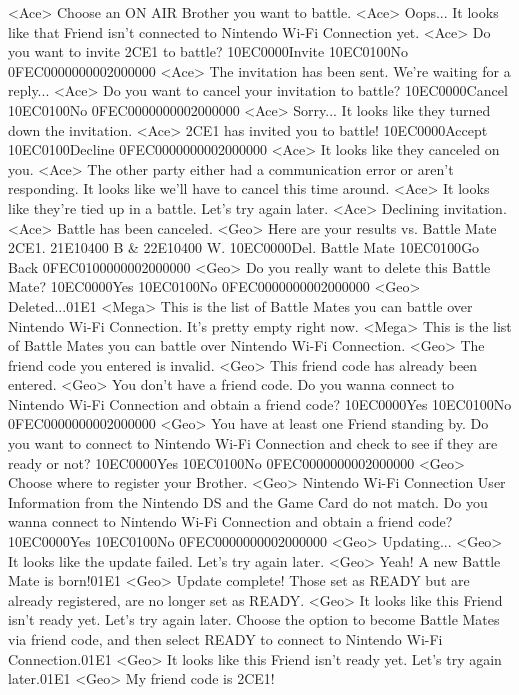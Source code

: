 <Ace> Choose an ON AIR Brother you want to battle. 
<Ace> Oops... It looks like that Friend isn't connected to Nintendo Wi-Fi Connection yet. 
<Ace> Do you want to invite {2C}{E1} to battle? {10}{EC}{00}{00}Invite {10}{EC}{01}{00}No {0F}{EC}{00}{00}{00}{00}{02}{00}{00}{00}
<Ace> The invitation has been sent. We're waiting for a reply...
<Ace> Do you want to cancel your invitation to battle? {10}{EC}{00}{00}Cancel {10}{EC}{01}{00}No {0F}{EC}{00}{00}{00}{00}{02}{00}{00}{00}
<Ace> Sorry... It looks like they turned down the invitation. 
<Ace> {2C}{E1} has invited you to battle! {10}{EC}{00}{00}Accept {10}{EC}{01}{00}Decline {0F}{EC}{00}{00}{00}{00}{02}{00}{00}{00}
<Ace> It looks like they canceled on you. 
<Ace> The other party either had a communication error or aren't responding. 
It looks like we'll have to cancel this time around. 
<Ace> It looks like they're tied up in a battle. Let's try again later. 
<Ace> Declining invitation.
<Ace> Battle has been canceled. 
<Geo> Here are your results vs. Battle Mate {2C}{E1}. {21}{E1}{04}{00} B & {22}{E1}{04}{00} W. {10}{EC}{00}{00}Del. Battle Mate {10}{EC}{01}{00}Go Back {0F}{EC}{01}{00}{00}{00}{02}{00}{00}{00}
<Geo> Do you really want to delete this Battle Mate? {10}{EC}{00}{00}Yes {10}{EC}{01}{00}No {0F}{EC}{00}{00}{00}{00}{02}{00}{00}{00}
<Geo> Deleted...{01}{E1}
<Mega> This is the list of Battle Mates you can battle over Nintendo Wi-Fi Connection. 
It's pretty empty right now. 
<Mega> This is the list of Battle Mates you can battle over Nintendo Wi-Fi Connection. 
<Geo> The friend code you entered is invalid. 
<Geo> This friend code has already been entered. 
<Geo> You don't have a friend code. Do you wanna connect to 
Nintendo Wi-Fi Connection and obtain a friend code? {10}{EC}{00}{00}Yes {10}{EC}{01}{00}No {0F}{EC}{00}{00}{00}{00}{02}{00}{00}{00}
<Geo> You have at least one Friend standing by. 
Do you want to connect to Nintendo Wi-Fi Connection and 
check to see if they are ready or not? {10}{EC}{00}{00}Yes {10}{EC}{01}{00}No {0F}{EC}{00}{00}{00}{00}{02}{00}{00}{00}
<Geo> Choose where to register your Brother. 
<Geo> Nintendo Wi-Fi Connection User Information from the 
Nintendo DS and the Game Card do not match. Do you wanna connect 
to Nintendo Wi-Fi Connection and obtain a friend code? {10}{EC}{00}{00}Yes {10}{EC}{01}{00}No {0F}{EC}{00}{00}{00}{00}{02}{00}{00}{00}
<Geo> Updating...
<Geo> It looks like the update failed. Let's try again later. 
<Geo> Yeah! A new Battle Mate is born!{01}{E1}
<Geo> Update complete! 
Those set as READY but are already registered, are 
no longer set as READY. 
<Geo> It looks like this Friend isn't ready yet. Let's try again later. 
Choose the option to become Battle Mates via friend code, and then 
select READY to connect to Nintendo Wi-Fi Connection.{01}{E1}
<Geo> It looks like this Friend isn't ready yet. Let's try again later.{01}{E1}
<Geo> My friend code is {2C}{E1}! 
